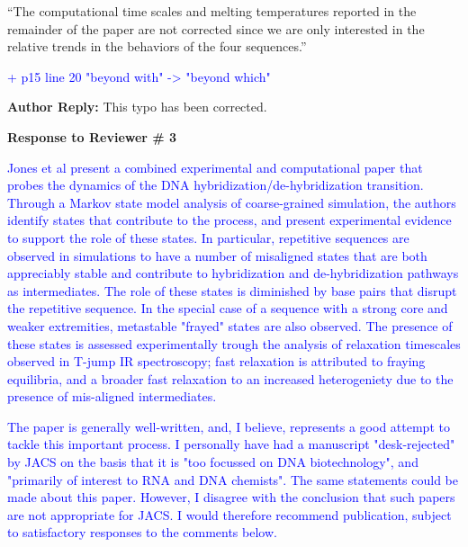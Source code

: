 \documentclass[11pt,a4paper]{letter} %
\newcommand*{\rood}[1]{{\color{red}{#1}}}
\begin{document}
``The computational time scales and melting temperatures reported in the remainder of the paper are not corrected \rood{by these calibration corrections or finite-size fluctuation corrections} since we are only interested in the relative trends in the behaviors of the four sequences.''




\textcolor{blue}{+ p15 line 20 "beyond with" -> "beyond which"}

\textbf{Author Reply:}    This typo has been corrected.








\clearpage
\newpage

\begin{shaded}
\textbf{Response to Reviewer \# 3}
\end{shaded}

\textcolor{blue}{Jones et al present a combined experimental and computational paper that probes the dynamics of the DNA hybridization/de-hybridization transition. Through a Markov state model analysis of coarse-grained simulation, the authors identify states that contribute to the process, and present experimental evidence to support the role of these states. In particular, repetitive sequences are observed in simulations to have a number of misaligned states that are both appreciably stable and contribute to hybridization and de-hybridization pathways as intermediates. The role of these states is diminished by base pairs that disrupt the repetitive sequence. In the special case of a sequence with a strong core and weaker extremities, metastable "frayed" states are also observed. The presence of these states is assessed experimentally trough the analysis of relaxation timescales observed in T-jump IR spectroscopy; fast relaxation is attributed to fraying equilibria, and a broader fast relaxation to an increased heterogeniety due to the presence of mis-aligned intermediates.}

\textcolor{blue}{The paper is generally well-written, and, I believe, represents a good attempt to tackle this important process. I personally have had a manuscript "desk-rejected" by JACS on the basis that it is "too focussed on DNA biotechnology", and "primarily of interest to RNA and DNA chemists". The same statements could be made about this paper. However, I disagree with the conclusion that such papers are not appropriate for JACS. I would therefore recommend publication, subject to satisfactory responses to the comments below.  }
\end{document}
